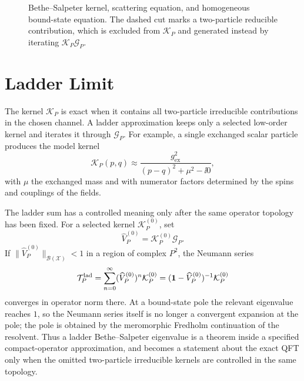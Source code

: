 \begin{figure}[!ht]
\caption{Bethe--Salpeter kernel, scattering equation, and homogeneous
bound-state equation.  The dashed cut marks a two-particle reducible
contribution, which is excluded from \(\mathcal K_P\) and generated instead by
iterating \(\mathcal K_P\mathcal G_P\).}
\label{fig:bethe-salpeter-kernel-homogeneous-equation}
\end{figure}

\section{Ladder Limit}

The kernel \(\mathcal K_P\) is exact when it contains all two-particle
irreducible contributions in the chosen channel. A ladder approximation keeps
only a selected low-order kernel and iterates it through \(\mathcal G_P\). For
example, a single exchanged scalar particle produces the model kernel
\[
  \mathcal K_P(p,q)
  \approx
  \frac{g_{\mathrm{ex}}^2}
       {(p-q)^2+\mu^2-\ii0},
\]
with \(\mu\) the exchanged mass and with numerator factors determined by the
spins and couplings of the fields.

The ladder sum has a controlled meaning only after the same operator topology
has been fixed.  For a selected kernel \(\mathcal K_P^{(0)}\), set
\[
  \widehat V_P^{(0)}=\mathcal K_P^{(0)}\mathcal G_P .
\]
If \(\|\widehat V_P^{(0)}\|_{\mathcal B(\mathcal X)}<1\) in a region of
complex \(P^2\), the Neumann series
\[
  \mathcal T_P^{\rm lad}
  =
  \sum_{n=0}^{\infty}(\widehat V_P^{(0)})^n\mathcal K_P^{(0)}
  =
  (\mathbf 1-\widehat V_P^{(0)})^{-1}\mathcal K_P^{(0)}
\]
converges in operator norm there.  At a bound-state pole the relevant
eigenvalue reaches \(1\), so the Neumann series itself is no longer a
convergent expansion at the pole; the pole is obtained by the meromorphic
Fredholm continuation of the resolvent.  Thus a ladder Bethe--Salpeter
eigenvalue is a theorem inside a specified compact-operator approximation, and
becomes a statement about the exact QFT only when the omitted two-particle
irreducible kernels are controlled in the same topology.

